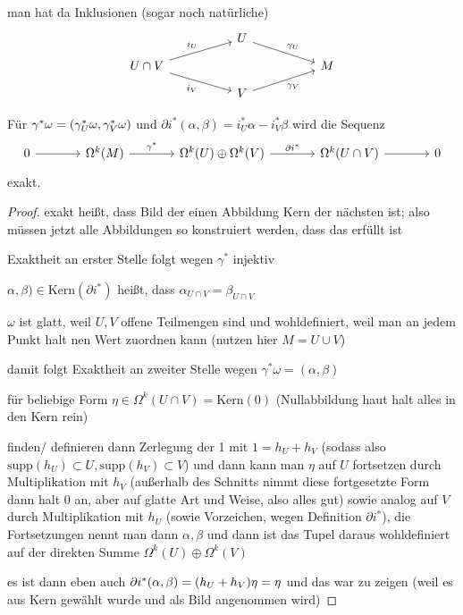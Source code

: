 \documentclass[../H_Analysis_main.tex]{subfiles}
\begin{document}
man hat da Inklusionen (sogar noch natürliche)
$$
\begin{tikzcd}[row sep = 8, column sep = 50]
 & U \arrow{dr}{\gamma_U} & 
\\
U \cap V \arrow{ur}{i_U} \arrow[swap]{dr}{i_V} &  & M
\\
 & V \arrow[swap]{ur}{\gamma_V} & 
\end{tikzcd}
$$

\begin{lemma}
Für $\gamma^* \omega = \qty(\gamma_U^* \omega, \gamma_V^* \omega)$ und $\partial i^*(\alpha, \beta) = i_U^* \alpha - i_V^* \beta$ wird die Sequenz
$$
\begin{tikzcd}[column sep = 36]
0 \arrow{r}{} & \Omega^k(M) \arrow{r}{\gamma^*} & \Omega^k(U) \oplus \Omega^k(V) \arrow{r}{\partial i^*} & \Omega^k(U \cap V) \arrow{r}{} & 0
\end{tikzcd}
$$
exakt.
\end{lemma}

\begin{proof}
exakt heißt, dass Bild der einen Abbildung Kern der nächsten ist; also müssen jetzt alle Abbildungen so konstruiert werden, dass das erfüllt ist


Exaktheit an erster Stelle folgt wegen $\gamma^*$ injektiv


$\alpha, \beta) \in \text{Kern}(\partial i^*)$ heißt, dass $\alpha_{U \cap V} = \beta_{U \cap V}$

$\omega$ ist glatt, weil $U, V$ offene Teilmengen sind und wohldefiniert, weil man an jedem Punkt halt nen Wert zuordnen kann (nutzen hier $M = U \cup V$)

damit folgt Exaktheit an zweiter Stelle wegen $\gamma^* \omega = (\alpha, \beta)$


für beliebige Form $\eta \in \Omega^k(U \cap V) = \text{Kern}(0)$ (Nullabbildung haut halt alles in den Kern rein)

finden/ definieren dann Zerlegung der 1 mit $1 = h_U + h_V$  (sodass also $\text{supp}(h_U) \subset U, \text{supp}(h_V) \subset V$) und dann kann man $\eta$ auf $U$ fortsetzen durch Multiplikation mit $h_V$ (außerhalb des Schnitts nimmt diese fortgesetzte Form dann halt 0 an, aber auf glatte Art und Weise, also alles gut) sowie analog auf $V$ durch Multiplikation mit $h_U$ (sowie Vorzeichen, wegen Definition $\partial i^*$), die Fortsetzungen nennt man dann $\alpha, \beta$ und dann ist das Tupel daraus wohldefiniert auf der direkten Summe $\Omega^k(U) \oplus \Omega^k(V)$

es ist dann eben auch $\partial i^*\qty(\alpha, \beta) = \qty(h_U + h_V) \eta = \eta$ und das war zu zeigen (weil es aus Kern gewählt wurde und als Bild angenommen wird)
\end{proof}
\end{document}
